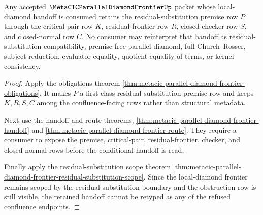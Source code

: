 \begin{theorem}
\label{thm:metacic-parallel-diamond-frontier-premise-retention}
Any accepted $\MetaCICParallelDiamondFrontierUp$ packet whose local-diamond handoff is consumed retains the residual-substitution premise row $P$ through the critical-pair row $K$, residual-frontier row $R$, closed-checker row $S$, and closed-normal row $C$. No consumer may reinterpret that handoff as residual-substitution compatibility, premise-free parallel diamond, full Church--Rosser, subject reduction, evaluator equality, quotient equality of terms, or kernel consistency.
\end{theorem}
\begin{proof}
Apply the obligations theorem \autoref{thm:metacic-parallel-diamond-frontier-obligations}. It makes $P$ a first-class residual-substitution premise row and keeps $K,R,S,C$ among the confluence-facing rows rather than structural metadata.

Next use the handoff and route theorems, \autoref{thm:metacic-parallel-diamond-frontier-handoff} and \autoref{thm:metacic-parallel-diamond-frontier-route}. They require a consumer to expose the premise, critical-pair, residual-frontier, checker, and closed-normal rows before the conditional handoff is read.

Finally apply the residual-substitution scope theorem \autoref{thm:metacic-parallel-diamond-frontier-residual-substitution-scope}. Since the local-diamond frontier remains scoped by the residual-substitution boundary and the obstruction row is still visible, the retained handoff cannot be retyped as any of the refused confluence endpoints.
\end{proof}

